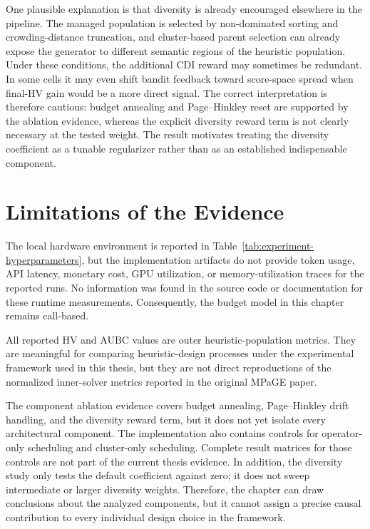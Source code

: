 \documentclass[../main.tex]{subfiles}
\begin{document}
One plausible explanation is that diversity is already encouraged elsewhere in the pipeline. The managed population is selected by non-dominated sorting and crowding-distance truncation, and cluster-based parent selection can already expose the generator to different semantic regions of the heuristic population. Under these conditions, the additional CDI reward may sometimes be redundant. In some cells it may even shift bandit feedback toward score-space spread when final-HV gain would be a more direct signal. The correct interpretation is therefore cautious: budget annealing and Page--Hinkley reset are supported by the ablation evidence, whereas the explicit diversity reward term is not clearly necessary at the tested weight. The result motivates treating the diversity coefficient as a tunable regularizer rather than as an established indispensable component.

\section*{Limitations of the Evidence}

The local hardware environment is reported in Table~\ref{tab:experiment-hyperparameters}, but the implementation artifacts do not provide token usage, API latency, monetary cost, GPU utilization, or memory-utilization traces for the reported runs. No information was found in the source code or documentation for these runtime measurements. Consequently, the budget model in this chapter remains call-based.

All reported HV and AUBC values are outer heuristic-population metrics. They are meaningful for comparing heuristic-design processes under the experimental framework used in this thesis, but they are not direct reproductions of the normalized inner-solver metrics reported in the original MPaGE paper.

The component ablation evidence covers budget annealing, Page--Hinkley drift handling, and the diversity reward term, but it does not yet isolate every architectural component. The implementation also contains controls for operator-only scheduling and cluster-only scheduling. Complete result matrices for those controls are not part of the current thesis evidence. In addition, the diversity study only tests the default coefficient against zero; it does not sweep intermediate or larger diversity weights. Therefore, the chapter can draw conclusions about the analyzed components, but it cannot assign a precise causal contribution to every individual design choice in the framework.
\end{document}
